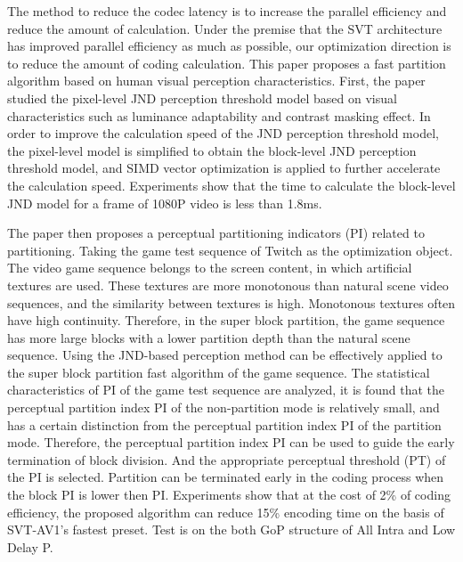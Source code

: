 \begin{bigabstract}
  The method to reduce the codec latency is to increase the parallel efficiency and reduce the amount of calculation. Under the premise that the SVT architecture has improved parallel efficiency as much as possible, our optimization direction is to reduce the amount of coding calculation. This paper proposes a fast partition algorithm based on human visual perception characteristics. First, the paper studied the pixel-level JND perception threshold model based on visual characteristics such as luminance adaptability and contrast masking effect. In order to improve the calculation speed of the JND perception threshold model, the pixel-level model is simplified to obtain the block-level JND perception threshold model, and SIMD vector optimization is applied to further accelerate the calculation speed. Experiments show that the time to calculate the block-level JND model for a frame of 1080P video is less than 1.8ms.

  The paper then proposes a perceptual partitioning indicators (PI) related to partitioning. Taking the game test sequence of Twitch as the optimization object. The video game sequence belongs to the screen content, in which artificial textures are used. These textures are more monotonous than natural scene video sequences, and the similarity between textures is high. Monotonous textures often have high continuity. Therefore, in the super block partition, the game sequence has more large blocks with a lower partition depth than the natural scene sequence. Using the JND-based perception method can be effectively applied to the super block partition fast algorithm of the game sequence. The statistical characteristics of PI of the game test sequence are analyzed, it is found that the perceptual partition index PI of the non-partition mode is relatively small, and has a certain distinction from the perceptual partition index PI of the partition mode. Therefore, the perceptual partition index PI can be used to guide the early termination of block division. And the appropriate perceptual threshold (PT) of the PI is selected. Partition can be  terminated early in the coding process when the block PI is lower then PI. Experiments show that at the cost of 2\% of coding efficiency, the proposed algorithm can reduce 15\% encoding time on the basis of SVT-AV1's fastest preset. Test is on the both GoP structure of All Intra and Low Delay P.
\end{bigabstract}

